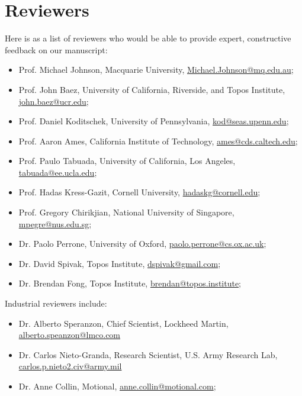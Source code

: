\documentclass[10pt, article, one side]{memoir}
\begin{document}
    \section{Reviewers}
    Here is as a list of reviewers who would be able to provide expert, constructive feedback on our manuscript:
    \begin{itemize}
        \item Prof.
              Michael Johnson, Macquarie University, \href{mailto:Michael.Johnson@mq.edu.au}{Michael.Johnson@mq.edu.au};
        \item Prof.
              John Baez, University of California, Riverside, and Topos Institute, \href{mailto:john.baez@ucr.edu}{john.baez@ucr.edu};
        \item Prof.
              Daniel Koditschek, University of Pennsylvania, \href{mailto:kod@seas.upenn.edu}{kod@seas.upenn.edu};
        \item Prof.
              Aaron Ames, California Institute of Technology, \href{mailto:ames@cds.caltech.edu}{ames@cds.caltech.edu};
        \item Prof.
              Paulo Tabuada, University of California, Los Angeles, \href{mailto:tabuada@ee.ucla.edu}{tabuada@ee.ucla.edu};
        \item Prof.
              Hadas Kress-Gazit, Cornell University, \href{mailto:hadaskg@cornell.edu}{hadaskg@cornell.edu};
        \item Prof.
              Gregory Chirikjian, National University of Singapore, \href{mailto:mpegre@nus.edu.sg}{mpegre@nus.edu.sg};
        \item Dr.
              Paolo Perrone, University of Oxford, \href{mailto:paolo.perrone@cs.ox.ac.uk}{paolo.perrone@cs.ox.ac.uk};
        \item Dr.
              David Spivak, Topos Institute, \href{mailto:dspivak@gmail.com}{dspivak@gmail.com};
        \item Dr.
              Brendan Fong, Topos Institute, \href{mailto:brendan@topos.institute}{brendan@topos.institute};
    \end{itemize}
    Industrial reviewers include:
    \begin{itemize}
        \item Dr.
              Alberto Speranzon, Chief Scientist, Lockheed Martin, \href{mailto:alberto.speanzon@lmco.com}{alberto.speanzon@lmco.com}
        \item Dr.
              Carlos Nieto-Granda, Research Scientist, U.S.
              Army Research Lab, \href{mailto:carlos.p.nieto2.civ@army.mil}{carlos.p.nieto2.civ@army.mil}
        \item Dr.
              Anne Collin, Motional, \href{mailto:anne.collin@motional.com}{anne.collin@motional.com};
    \end{itemize}
\end{document}
